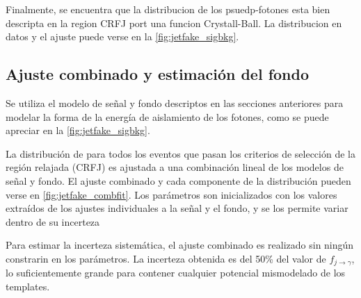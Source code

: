 Finalmente, se encuentra que la distribucion de los psuedp-fotones esta bien descripta en la region CRFJ port una funcion
Crystall-Ball. La distribucion en datos y el ajuste puede verse en la \cref{fig:jetfake_sigbkg}.


\subsection{Ajuste combinado y estimación del fondo} \label{sec:jet_fake_results}

Se utiliza el modelo de señal y fondo descriptos en las secciones anteriores para
modelar la forma de la energía de aislamiento de los fotones, como se puede
apreciar en la \cref{fig:jetfake_sigbkg}.

La distribución de {\etiso} para todos los eventos que pasan los criterios de
selección de la región relajada (CRFJ) es ajustada a una combinación lineal de
los modelos de señal y fondo. El ajuste combinado y cada componente de la
distribución pueden verse en \cref{fig:jetfake_combfit}. Los parámetros son
inicializados con los valores extraídos de los ajustes individuales a la señal y
el fondo, y se los permite variar dentro de su incerteza

Para estimar la incerteza sistemática, el ajuste combinado es realizado
sin ningún constrarin en los parámetros. La incerteza obtenida es del
50\% del valor de $f_{j\to\gamma}$, lo suficientemente grande para contener
cualquier potencial mismodelado de los templates.

